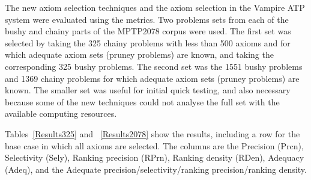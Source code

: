 \documentclass[EPiC]{easychair}
\begin{document}
The new axiom selection techniques and the axiom selection in the Vampire 
ATP system were evaluated using the metrics.
Two problems sets from each of the bushy and chainy parts of the MPTP2078 
corpus were used. 
The first set was selected by taking the 325 chainy problems with less than 
500 axioms and for which adequate axiom sets (pruney problems) are known, 
and taking the corresponding 325 bushy problems.
The second set was the 1551 bushy problems and 1369 chainy problems for which
adequate axiom sets (pruney problems) are known.
The smaller set was useful for initial quick testing, and also necessary 
because some of the new techniques could not analyse the full set with the 
available computing resources.

Tables~\ref{Results325} and ~\ref{Results2078} show the results, including
a row for the base case in which all axioms are selected.
The columns are the 
Precision (Prcn), 
Selectivity (Sely), 
Ranking precision (RPrn), 
Ranking density (RDen), 
Adequacy (Adeq),
and the Adequate precision/selectivity/ranking precision/ranking density.
\end{document}

